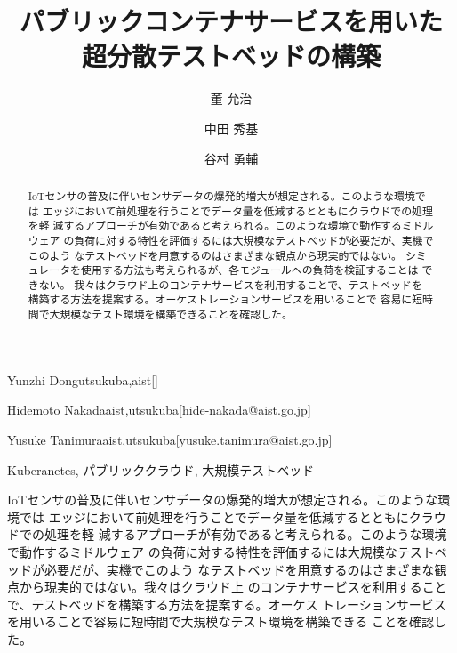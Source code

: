 \documentclass[submit,techrep]{ipsj}
\begin{document}
\title{パブリックコンテナサービスを用いた\\超分散テストベッドの構築}




\author{董 允治}{Yunzhi Dong}{utsukuba,aist}[]
\author{中田 秀基}{Hidemoto Nakada}{aist,utsukuba}[hide-nakada@aist.go.jp]
\author{谷村 勇輔}{Yusuke Tanimura}{aist,utsukuba}[yusuke.tanimura@aist.go.jp]


\begin{abstract}
  IoTセンサの普及に伴いセンサデータの爆発的増大が想定される。このような環境では
  エッジにおいて前処理を行うことでデータ量を低減するとともにクラウドでの処理を軽
  減するアプローチが有効であると考えられる。このような環境で動作するミドルウェア
  の負荷に対する特性を評価するには大規模なテストベッドが必要だが、実機でこのよう
  なテストベッドを用意するのはさまざまな観点から現実的ではない。
  シミュレータを使用する方法も考えられるが、各モジュールへの負荷を検証することは
  できない。
  我々はクラウド上のコンテナサービスを利用することで、テストベッドを
  構築する方法を提案する。オーケストレーションサービスを用いることで
  容易に短時間で大規模なテスト環境を構築できることを確認した。
\end{abstract}

\begin{jkeyword}
  Kuberanetes, パブリッククラウド, 大規模テストベッド
\end{jkeyword}

\begin{eabstract}
  IoTセンサの普及に伴いセンサデータの爆発的増大が想定される。このような環境では
  エッジにおいて前処理を行うことでデータ量を低減するとともにクラウドでの処理を軽
  減するアプローチが有効であると考えられる。このような環境で動作するミドルウェア
  の負荷に対する特性を評価するには大規模なテストベッドが必要だが、実機でこのよう
  なテストベッドを用意するのはさまざまな観点から現実的ではない。我々はクラウド上
  のコンテナサービスを利用することで、テストベッドを構築する方法を提案する。オーケス
  トレーションサービスを用いることで容易に短時間で大規模なテスト環境を構築できる
  ことを確認した。
\end{eabstract}
\end{document}
